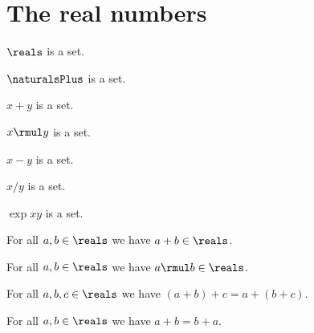 \section{The real numbers}

\begin{signature} \label{sig1}
    $\reals$ is a set.
\end{signature}

\begin{signature} \label{sig2}
    $\naturalsPlus$ is a set.
\end{signature}

\begin{signature} \label{sig3}
    $x + y$ is a set.
\end{signature}

\begin{signature} \label{sig4}
    $x \rmul y$ is a set.
\end{signature}

\begin{signature} \label{sig5}
    $x - y$ is a set.
\end{signature}

\begin{signature} \label{sig6}
    $x / y$ is a set.
\end{signature}

\begin{signature} \label{sig7}
    $\exp{x}{y}$ is a set.
\end{signature}

\begin{axiom}\label{real_add_closed}
    For all $a, b\in\reals$ we have $a + b\in\reals$.
\end{axiom}

\begin{axiom}\label{real_mul_closed}
    For all $a, b\in\reals$ we have $a \rmul b\in\reals$.
\end{axiom}

\begin{axiom}\label{real_add_assoc}
    For all $a, b, c\in\reals$ we have $(a + b) + c = a + (b + c)$.
\end{axiom}

\begin{axiom}\label{real_add_comm}
    For all $a, b\in\reals$ we have $a + b = b + a$.
\end{axiom}

